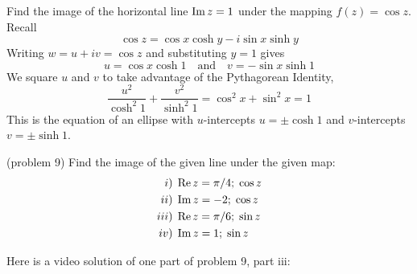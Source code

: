 \documentclass[handout]{ximera}
\begin{document}
\begin{example}[example 9]
Find the image of the horizontal line $\operatorname{Im} z =1$ under the mapping $f(z) = \cos z$.\\
Recall
\[
\cos z = \cos x \cosh y - i \sin x \sinh y
\]
Writing $w = u+iv = \cos z$ and substituting $y = 1$ gives
\[
u = \cos x \cosh 1 \quad \mbox{and} \quad v = -\sin x \sinh 1
\]
We square $u$ and $v$ to take advantage of the Pythagorean Identity,
\[
\frac{u^2}{\cosh^2 1} + \frac{v^2}{\sinh^2 1} = \cos^2 x + \sin^2 x = 1
\]
This is the equation of an ellipse with $u$-intercepts $u = \pm \cosh 1$
and $v$-intercepts $v = \pm \sinh 1$.


\begin{image}
\end{image}


\end{example}


\begin{problem}(problem 9)
Find the image of the given line under the given map:
\begin{align*}
i)\; & \operatorname{Re} z = \pi/4; \; \cos z \\
ii)\; & \operatorname{Im} z = -2; \; \cos z \\
iii)\; & \operatorname{Re} z = \pi/6; \; \sin z\\
iv)\; & \operatorname{Im} z = 1; \; \sin z
\end{align*}
\end{problem}

Here is a video solution of one part of problem 9, part iii:\\
\begin{foldable}
\end{foldable}
\end{document}
